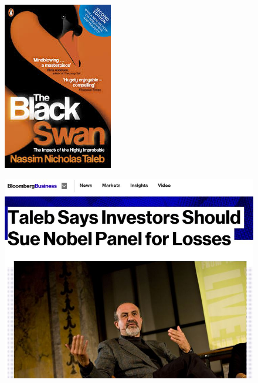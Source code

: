 \documentclass[MAIN.tex]{subfiles}
\begin{document}
 
\begin{frame}
\begin{figure}
\centering
\includegraphics[width=0.5\linewidth]{images/blackswan}

\end{figure}

\end{frame}
	\begin{frame}

\begin{figure}
\centering
\includegraphics[width=1.05\linewidth]{images/taleb}

\end{figure}

	\end{frame}
\end{document}
